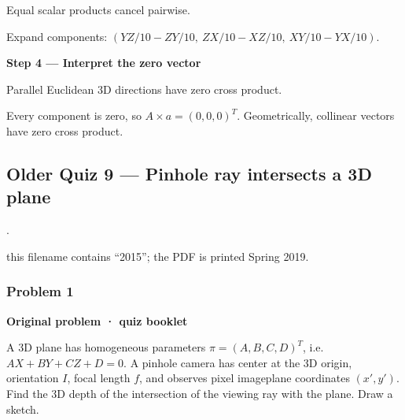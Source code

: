 \documentclass[letterpaper,11pt,english,openany,oneside]{jupyterBook}
\begin{document}
\sphinxAtStartPar
{} Equal scalar products cancel pairwise.

\sphinxAtStartPar
Expand components: {\color{QuizMathBlue} \((YZ/10-ZY/10,\ ZX/10-XZ/10,\ XY/10-YX/10)\)}.

\par

\par\medskip{}
{\color{QuizStepRed}\bfseries Step 4 — Interpret the zero vector}\par\smallskip

\sphinxAtStartPar
{} Parallel Euclidean 3D directions have zero cross product.

\sphinxAtStartPar
Every component is zero, so {\color{QuizMathBlue} \(\boxed{A\times a=(0,0,0)^T}\)}. Geometrically, collinear vectors have zero cross product.

\par


\subsection{Older Quiz 9 — Pinhole ray intersects a 3D plane}
\label{\detokenize{lectures/lecture03/quiz-workbook:older-quiz-9-pinhole-ray-intersects-a-3d-plane}}\label{\detokenize{lectures/lecture03/quiz-workbook:quiz-source-15}}
\sphinxAtStartPar
{} .

\sphinxAtStartPar
{} this filename contains “2015”; the PDF is printed Spring 2019.


\subsubsection{Problem 1}
\label{\detokenize{lectures/lecture03/quiz-workbook:quiz-15-q1}}\label{\detokenize{lectures/lecture03/quiz-workbook:id7}}
\par\medskip\textbf{Original problem · quiz booklet}\par\smallskip

\sphinxAtStartPar
A 3D plane has homogeneous parameters \(\pi=(A,B,C,D)^T\), i.e. \(AX+BY+CZ+D=0\). A pinhole camera has center at the 3D origin, orientation \(I\), focal length \(f\), and observes pixel image\sphinxhyphen{}plane coordinates \((x',y')\). Find the 3D depth of the intersection of the viewing ray with the plane. Draw a sketch.
\end{document}
